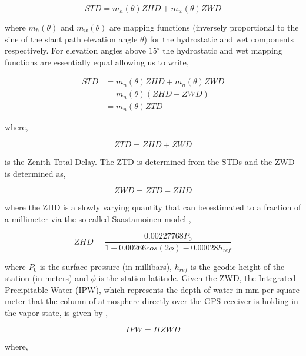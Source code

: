 \documentclass[proposal]{umassthesis}
\begin{document}
{\begin{equation}
STD = m_h(\theta) ZHD + m_w(\theta) ZWD
\end{equation}

where $m_h(\theta)$ and $m_w(\theta)$ are mapping functions (inversely proportional to the sine of the slant path elevation angle $\theta$) for the hydrostatic and wet components respectively. For elevation angles above $15^{\circ}$ the hydrostatic and wet mapping functions are essentially equal allowing us to write,

\begin{equation}
\begin{align*}
STD &= m_n(\theta) ZHD + m_n(\theta) ZWD \\
&= m_n(\theta) ( ZHD + ZWD ) \\
&= m_n(\theta) ZTD
\end{align*}
\end{equation}

where,

\begin{equation}
ZTD = ZHD + ZWD
\end{equation}

is the Zenith Total Delay. The ZTD is determined from the STDs \cite{tralli1990stochastic} and the ZWD is determined as,

\begin{equation}
ZWD = ZTD - ZHD
\end{equation}

where the ZHD is a slowly varying quantity that can be estimated to a fraction of a millimeter via the so-called Saastamoinen model \cite{saastamoinen1972atmospheric},

\begin{equation}
ZHD = \dfrac{0.00227768 P_0}{1 - 0.00266 cos(2\phi) - 0.00028 h_{ref}}
\end{equation}

where $P_0$ is the surface pressure (in millibars), $h_{ref}$ is the geodic height of the station (in meters) and $\phi$ is the station latitude. Given the ZWD, the Integrated Precipitable Water (IPW), which represents the depth of water in mm per square meter that the column of atmosphere directly over the GPS receiver is holding in the vapor state, is given by \cite{bevis1994gps},

\begin{equation}
IPW = \Pi ZWD
\end{equation}

where,

}
\end{document}

